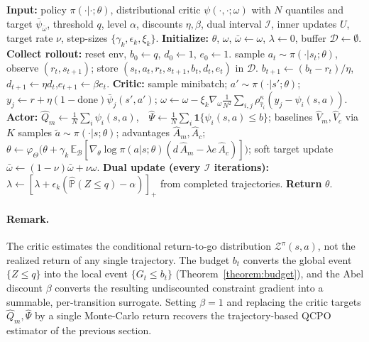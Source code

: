 \begin{algorithm}[ht]
\small
\caption{Distributional Quantile-Constrained Actor-Critic with Abel Discount (DQC-AC-$\beta$)}
\label{alg:dqcacbeta}
\begin{algorithmic}[1]
\STATE \textbf{Input:} policy $\pi(\cdot|\cdot;\theta)$, distributional critic $\psi(\cdot,\cdot;\omega)$ with $N$ quantiles and target $\bar{\psi}_{\bar{\omega}}$, threshold $q$, level $\alpha$, discounts $\eta,\beta$, dual interval $\mathcal{I}$, inner updates $U$, target rate $\nu$, step-sizes $\{\gamma_k,\epsilon_k,\xi_k\}$.
\STATE \textbf{Initialize:} $\theta$, $\omega$, $\bar{\omega}\gets\omega$, $\lambda\gets0$, buffer $\mathcal{D}\gets\emptyset$.
    \STATE \textbf{Collect rollout:} reset env, $b_0\gets q$, $d_0\gets1$, $e_0\gets1$.
        \STATE sample $a_t\sim\pi(\cdot|s_t;\theta)$, observe $(r_t,s_{t+1})$; store $(s_t,a_t,r_t,s_{t+1},b_t,d_t,e_t)$ in $\mathcal{D}$.
        \STATE $b_{t+1}\gets(b_t-r_t)/\eta$,\quad $d_{t+1}\gets\eta d_t$,\quad $e_{t+1}\gets\beta e_t$.
    \ENDFOR
        \STATE \textbf{Critic:} sample minibatch; $a'\sim\pi(\cdot|s';\theta)$; $y_j\gets r+\eta(1-\mathrm{done})\bar{\psi}_j(s',a')$;
        \STATE \quad $\omega\gets\omega-\xi_k\nabla_{\omega}\frac{1}{N^2}\sum_{i,j}\rho^{\kappa}_{\hat{\tau}_i}(y_j-\psi_i(s,a))$.
        \STATE \textbf{Actor:} $\widehat{Q}_m\gets\frac{1}{N}\sum_i\psi_i(s,a)$,\ \ $\widehat{\Psi}\gets\frac{1}{N}\sum_i\mathbf{1}\{\psi_i(s,a)\le b\}$;
        \STATE \quad baselines $\widehat{V}_m,\widehat{V}_c$ via $K$ samples $\tilde{a}\sim\pi(\cdot|s;\theta)$; advantages $\widehat{A}_m,\widehat{A}_c$;
        \STATE \quad $\theta\gets\varphi_{\Theta}\!\bigl(\theta+\gamma_k\,\mathbb{E}_{\mathcal{B}}[\nabla_{\theta}\log\pi(a|s;\theta)(d\,\widehat{A}_m-\lambda e\,\widehat{A}_c)]\bigr)$;
        \STATE \quad soft target update $\bar{\omega}\gets(1-\nu)\bar{\omega}+\nu\omega$.
    \ENDFOR
    \STATE \textbf{Dual update (every $\mathcal{I}$ iterations):} $\lambda\gets[\lambda+\epsilon_k(\widehat{\mathbb{P}}(Z\le q)-\alpha)]_{+}$ from completed trajectories.
\ENDFOR
\STATE \textbf{Return} $\theta$.
\end{algorithmic}
\end{algorithm}

\paragraph{Remark.}
The critic estimates the conditional return-to-go distribution $\mathcal{Z}^{\pi}(s,a)$, not the realized return of any single trajectory. The budget $b_t$ converts the global event $\{Z\le q\}$ into the local event $\{G_t\le b_t\}$ (Theorem~\ref{theorem:budget}), and the Abel discount $\beta$ converts the resulting undiscounted constraint gradient into a summable, per-transition surrogate. Setting $\beta=1$ and replacing the critic targets $\widehat{Q}_m,\widehat{\Psi}$ by a single Monte-Carlo return recovers the trajectory-based QCPO estimator of the previous section.


